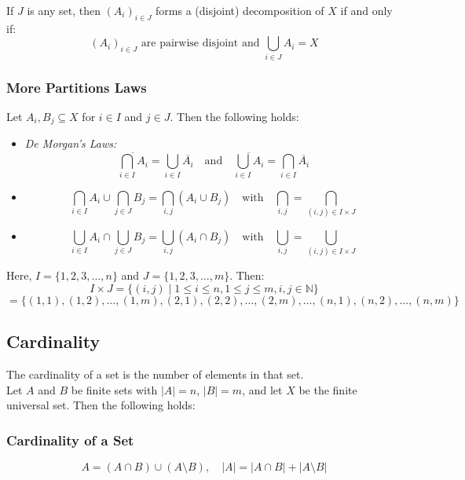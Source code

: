 If \( J \) is any set, then \( {(A_i)}_{i \in J} \) forms a (disjoint) decomposition of \( X \) if and only if:
\[
	{(A_i)}_{i \in J} \text{ are pairwise disjoint and } \bigcup_{i \in J} A_i = X
\]

\subsubsection{More Partitions Laws}
Let \( A_i, B_j \subseteq X \) for \( i \in I \) and \( j \in J \). Then the following holds:

\begin{itemize}[label=\(-\)]


	\item\emph{De Morgan's Laws:}
	\[
		\overline{\bigcap_{i \in I} A_i}= \bigcup_{i \in I} \overline{A_i} \quad \text{and} \quad \overline{\bigcup_{i \in I} A_i} = \bigcap_{i \in I} \overline{A_i}
	\]

	\item\[
		\bigcap_{i \in I} A_i \cup \bigcap_{j \in J} B_j = \bigcap_{i,j} (A_i \cup B_j) \quad \text{with} \quad \bigcap_{i,j} = \bigcap_{(i,j) \in I \times J}
	\]


	\item\[
		\bigcup_{i \in I} A_i \cap \bigcup_{j \in J} B_j = \bigcup_{i,j} (A_i \cap B_j) \quad \text{with} \quad \bigcup_{i,j} = \bigcup_{(i,j) \in I \times J}
	\]

\end{itemize}

Here, \( I = \{ 1, 2, 3, \dots, n \} \) and \( J = \{ 1, 2, 3, \dots, m \} \). Then:
\[
	I \times J = \{ (i, j) \mid 1 \leq i \leq n, 1 \leq j \leq m, i, j \in \mathbb{N} \}
\]
\[
	= \{ (1, 1), (1, 2), \dots, (1, m), (2, 1), (2, 2), \dots, (2, m), \dots, (n, 1), (n, 2), \dots, (n, m) \}
\]

\subsection{Cardinality}

The cardinality of a set is the number of elements in that set.
\\
Let \( A \) and \( B \) be finite sets with \( |A| = n \), \( |B| = m \), and let \( X \) be the finite universal set. Then the following holds:

\subsubsection{Cardinality of a Set}
\[
	A = (A \cap B) \cup (A \setminus B), \quad |A| = |A \cap B| + |A \setminus B|
\]

